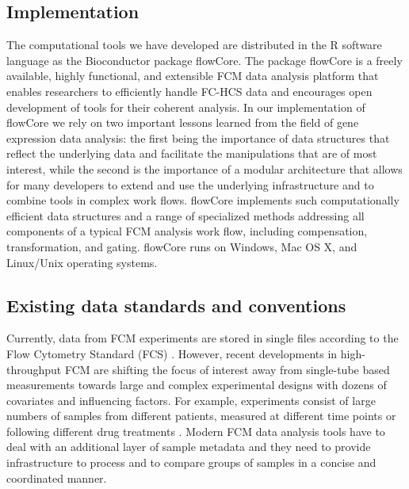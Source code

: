 \documentclass[10pt]{bmc_article}
\newcommand{\Rpackage}[1]{{\textsf{#1}}}
\newenvironment{bmcformat}{\begin{raggedright}\baselineskip20pt\sloppy\setboolean{publ}{false}}{\end{raggedright}\baselineskip20pt\sloppy}
\begin{document}
\begin{bmcformat}
 
\section*{Implementation}
The computational tools we have developed are distributed in the R
software language \cite{Rmain} as the Bioconductor \cite{BIOC} package
\Rpackage{flowCore}.  The package \Rpackage{flowCore} is a freely
available, highly functional, and extensible FCM data analysis
platform that enables researchers to efficiently handle FC-HCS data
and encourages open development of tools for their coherent
analysis. In our implementation of \Rpackage{flowCore} we rely on two
important lessons learned from the field of gene expression data
analysis: the first being the importance of data structures that
reflect the underlying data and facilitate the manipulations that are
of most interest, while the second is the importance of a modular
architecture that allows for many developers to extend and use the
underlying infrastructure and to combine tools in complex work flows.
\Rpackage{flowCore} implements such computationally efficient data
structures and a range of specialized methods addressing all
components of a typical FCM analysis work flow, including
compensation, transformation, and gating. \Rpackage{flowCore} runs on
Windows, Mac OS X, and Linux/Unix operating systems. 

\subsection*{Existing data standards and conventions}
Currently, data from FCM experiments are stored in single files
according to the Flow Cytometry Standard (FCS) \cite{seamer1997pnd}.
However, recent developments in high-throughput FCM are shifting the
focus of interest away from single-tube based measurements towards
large and complex experimental designs with dozens of covariates and
influencing factors. For example, experiments consist of large numbers
of samples from different patients, measured at different time points
\cite{brinkman2007hcf} or following different drug treatments
\cite{gasparetto2004ice}. Modern FCM data analysis tools have to deal
with an additional layer of sample metadata and they need to provide
infrastructure to process and to compare groups of samples in a
concise and coordinated manner.


\end{bmcformat}
\end{document}
